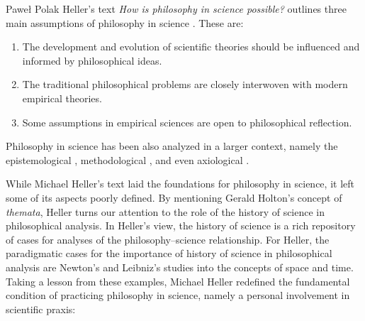 \begin{artengenv}{Paweł Polak}
Heller’s text \textit{How is philosophy in science possible?} outlines three main assumptions of philosophy in science
\parencite[p.\pageref{heller-three-points}]{pol_heller_how_2019}.
These are:

\begin{enumerate}[label=(\alph*)]
\item The development and evolution of scientific theories should be influenced and informed by philosophical ideas.
\item The traditional philosophical problems are closely interwoven with modern empirical theories.
\item Some assumptions in empirical sciences are open to philosophical reflection.
\end{enumerate}

Philosophy in science has been also analyzed in a larger context, namely the epistemological
\parencite{pol_heller_epistemologiczne_1987},
methodological
\parencite{pol_zycinski_structure_1988},
and even axiological
\parencites{pol_mcmullin_values_1982}[see also][]{pol_rodzen_w_1999}.

While Michael Heller’s text laid the foundations for philosophy in science, it left some of its aspects poorly defined.
By mentioning Gerald Holton’s concept of \textit{themata}, Heller turns our attention to the role of the history of
science in philosophical analysis. In Heller’s view, the history of science is a rich repository of cases for analyses
of the philosophy–science relationship. For Heller, the paradigmatic cases for the importance of history of science in
philosophical analysis are Newton’s and Leibniz’s studies into the concepts of space and time. Taking a lesson from
these examples, Michael Heller redefined the fundamental condition of practicing philosophy in science, namely a
personal involvement in scientific praxis:



\end{artengenv}
